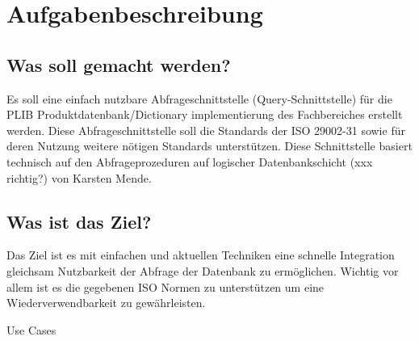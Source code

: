 \chapter{Aufgabenbeschreibung} \label{Aufgabenbeschreibung}

\section{Was soll gemacht werden?} 

Es soll eine einfach nutzbare Abfrageschnittstelle (Query-Schnittstelle) für die PLIB Produktdatenbank/Dictionary implementierung des Fachbereiches erstellt werden. Diese Abfrageschnittstelle soll die Standards der ISO 29002-31 sowie für deren Nutzung weitere nötigen Standards unterstützen. Diese Schnittstelle basiert technisch auf den Abfrageprozeduren auf logischer Datenbankschicht (xxx richtig?) von Karsten Mende.

\section{Was ist das Ziel?}
Das Ziel ist es mit einfachen und aktuellen Techniken eine schnelle Integration gleichsam Nutzbarkeit der Abfrage der Datenbank zu ermöglichen. Wichtig vor allem ist es die gegebenen ISO Normen zu unterstützen um eine Wiederverwendbarkeit zu gewährleisten. 



Use Cases
